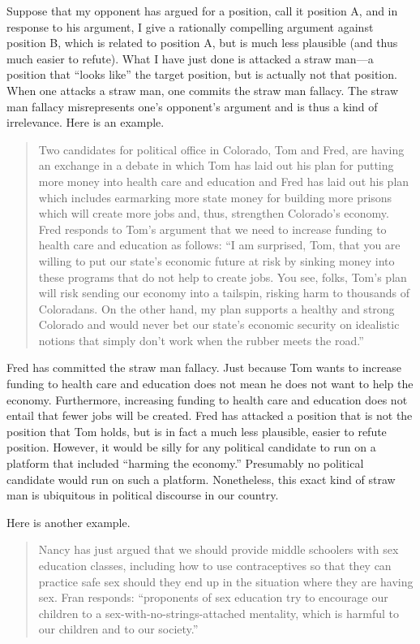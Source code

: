 Suppose that my opponent has argued for a position, call it position A, and in response to his argument, I give a rationally compelling argument against position B, which is related to position A, but is much less plausible (and thus much easier to refute). What I have just done is attacked a straw man---a position that ``looks like'' the target position, but is actually not that position. When one attacks a straw man, one commits the straw man fallacy. The straw man fallacy misrepresents one's opponent's argument and is thus a kind of
irrelevance. Here is an example.
\begin{quote}
Two candidates for political office in Colorado, Tom and Fred, are having an exchange in a debate in which Tom has laid out his plan for putting more money into health care and education and Fred has laid out his plan which includes earmarking more state money for building more prisons which will create more jobs and, thus, strengthen Colorado's economy. Fred responds to Tom's argument that we need to increase funding to health care and education as follows: ``I am surprised, Tom, that you are willing to put our state's economic future at risk by sinking money into these programs that do not help to create jobs. You see, folks, Tom's plan will risk sending our economy into a tailspin, risking harm to thousands of Coloradans. On the other hand, my plan supports a healthy and strong Colorado and would never bet our state's economic security on idealistic notions that simply don't work when the rubber meets the road.''
\end{quote}

Fred has committed the straw man fallacy. Just because Tom wants to increase funding to health care and education does not mean he does not want to help the economy. Furthermore, increasing funding to health care and education does not entail that fewer jobs will be created. Fred has attacked a position that is not the position that Tom holds, but is in fact a much less plausible, easier to refute position. However, it would be silly for any political candidate to run on a platform that included ``harming the economy.'' Presumably no political candidate would run on such a platform. Nonetheless, this exact kind of straw man is ubiquitous in political discourse in our country.

Here is another example.
\begin{quote}
Nancy has just argued that we should provide middle schoolers with sex education classes, including how to use contraceptives so that they can practice safe sex should they end up in the situation where they are having sex. Fran responds: ``proponents of sex education try to encourage our children to a sex-with-no-strings-attached mentality, which is harmful to our children and to our society.''
\end{quote}

